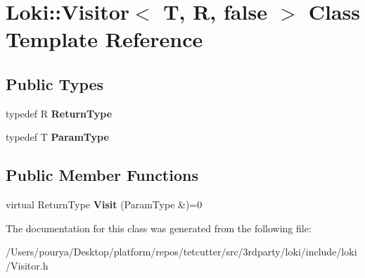 \hypertarget{classLoki_1_1Visitor_3_01T_00_01R_00_01false_01_4}{}\section{Loki\+:\+:Visitor$<$ T, R, false $>$ Class Template Reference}
\label{classLoki_1_1Visitor_3_01T_00_01R_00_01false_01_4}
\subsection*{Public Types}
\begin{DoxyCompactItemize}
\item 
\hypertarget{classLoki_1_1Visitor_3_01T_00_01R_00_01false_01_4_a43fbf77044dd90963252a3ecc45df41b}{}typedef R {\bfseries Return\+Type}\label{classLoki_1_1Visitor_3_01T_00_01R_00_01false_01_4_a43fbf77044dd90963252a3ecc45df41b}

\item 
\hypertarget{classLoki_1_1Visitor_3_01T_00_01R_00_01false_01_4_a9152e74c232138a961e690cb7e0ff0d0}{}typedef T {\bfseries Param\+Type}\label{classLoki_1_1Visitor_3_01T_00_01R_00_01false_01_4_a9152e74c232138a961e690cb7e0ff0d0}

\end{DoxyCompactItemize}
\subsection*{Public Member Functions}
\begin{DoxyCompactItemize}
\item 
\hypertarget{classLoki_1_1Visitor_3_01T_00_01R_00_01false_01_4_a271ad069a4b4edd569657bc3ac4d6559}{}virtual Return\+Type {\bfseries Visit} (Param\+Type \&)=0\label{classLoki_1_1Visitor_3_01T_00_01R_00_01false_01_4_a271ad069a4b4edd569657bc3ac4d6559}

\end{DoxyCompactItemize}


The documentation for this class was generated from the following file\+:\begin{DoxyCompactItemize}
\item 
/\+Users/pourya/\+Desktop/platform/repos/tetcutter/src/3rdparty/loki/include/loki/Visitor.\+h\end{DoxyCompactItemize}
